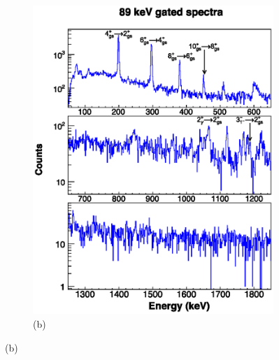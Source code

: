     \begin{figure}
    \ContinuedFloat
    \begin{subfigure}{\textwidth}
    \includegraphics[scale=1.3]{156GdTablesAndFigs/89_gamma.eps}
    \caption*{(b)}
    \label{fig:156_2to0spec}
    \end{subfigure}
\end{figure}